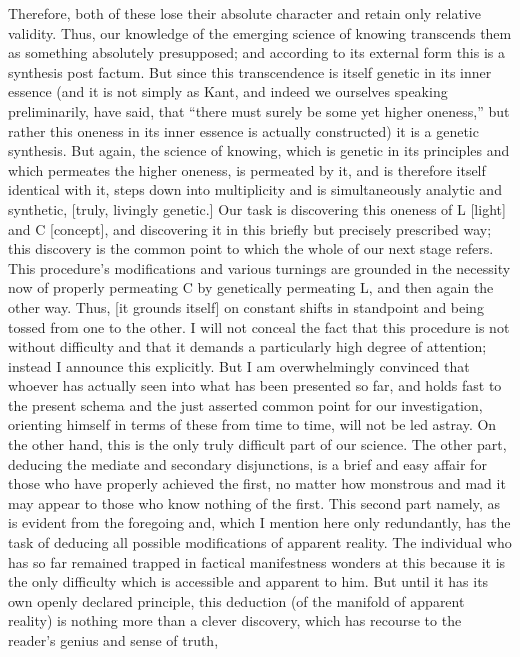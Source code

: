 Therefore, both of these lose their absolute character
and retain only relative validity.
Thus, our knowledge of the emerging
science of knowing transcends
them as something absolutely presupposed;
and according to its external form
this is a synthesis post factum.
But since this transcendence is
itself genetic in its inner essence
(and it is not simply as Kant,
and indeed we ourselves speaking preliminarily, have said,
that “there must surely be some yet higher oneness,”
but rather this oneness in its inner essence is
actually constructed)
it is a genetic synthesis.
But again, the science of knowing,
which is genetic in its principles
and which permeates the higher oneness,
is permeated by it,
and is therefore itself identical with it,
steps down into multiplicity and is
simultaneously analytic and synthetic,
[truly, livingly genetic.]
Our task is discovering this
oneness of L [light] and C [concept],
and discovering it in this briefly
but precisely prescribed way;
this discovery is the common point to which the
whole of our next stage refers.
This procedure’s modifications
and various turnings are grounded in
the necessity now of properly permeating C
by genetically permeating L,
and then again the other way.
Thus, [it grounds itself] on
constant shifts in standpoint
and being tossed from one to the other.
I will not conceal the fact that
this procedure is not without difficulty
and that it demands a particularly
high degree of attention;
instead I announce this explicitly.
But I am overwhelmingly convinced
that whoever has actually seen into
what has been presented so far,
and holds fast to the present schema
and the just asserted common point for our investigation,
orienting himself in terms of these from time to time,
will not be led astray.
On the other hand,
this is the only truly difficult part of our science.
The other part,
deducing the mediate and secondary disjunctions,
is a brief and easy affair for those
who have properly achieved the first,
no matter how monstrous and mad
it may appear to those who know nothing of the first.
This second part namely,
as is evident from the foregoing
and, which I mention here only redundantly,
has the task of deducing all possible modifications
of apparent reality.
The individual who has so far remained trapped
in factical manifestness wonders at this
because it is the only difficulty
which is accessible and apparent to him.
But until it has its own openly declared principle,
this deduction (of the manifold of apparent reality) is
nothing more than a clever discovery,
which has recourse to the reader’s genius and sense of truth,
